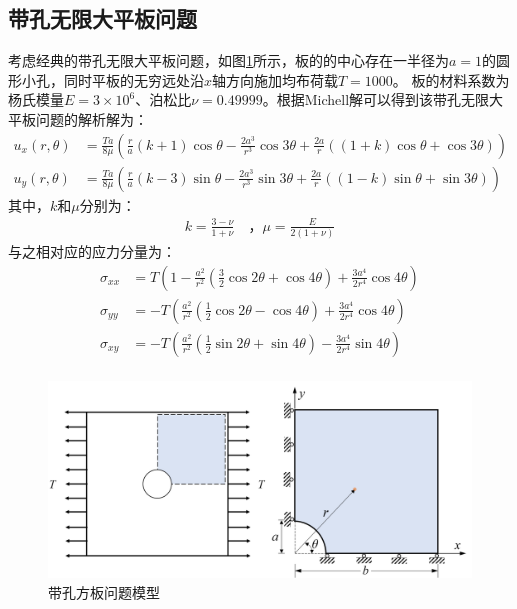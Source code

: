 \subsection{带孔无限大平板问题}

考虑经典的带孔无限大平板问题，如图\ref{ch_4:fig:hole}所示，板的的中心存在一半径为$a=1$的圆形小孔，同时平板的无穷远处沿$x$轴方向施加均布荷载$T=1000$。 板的材料系数为杨氏模量$E=3\times10^6$、泊松比$\nu=0.49999$。根据Michell解可以得到该带孔无限大平板问题的解析解为：
\begin{equation}\label{ch_4:eq:plate_with_hole_exact}
    \begin{split}
        u_x(r,\theta)&=\frac{Ta}{8\mu}(\frac{r}{a}(k+1)\cos\theta-\frac{2a^3}{r^3}\cos3\theta    +\frac{2a}{r}((1+k)\cos\theta+\cos3\theta))\\
        u_y(r,\theta)&=\frac{Ta}{8\mu}(\frac{r}{a}(k-3)\sin\theta-\frac{2a^3}{r^3}\sin3\theta    +\frac{2a}{r}((1-k)\sin\theta+\sin3\theta))  
    \end{split}
\end{equation}
其中，$k$和$\mu$分别为：
\begin{equation}
    \begin{split}
        k=\frac{3-\nu}{1+\nu}\quad \text{，}\mu=\frac{E}{2(1+\nu)}
    \end{split}
\end{equation}
与之相对应的应力分量为：
\begin{equation}
\begin{split}
    \sigma_{xx}&=T(1-\frac{a^2}{r^2}(\frac{3}{2}\cos2\theta+\cos4\theta)+\frac{3a^4}{2r^4}\cos4\theta)\\
    \sigma_{yy}&=-T(\frac{a^2}{r^2}(\frac{1}{2}\cos2\theta-\cos4\theta)+\frac{3a^4}{2r^4}\cos4\theta)\\
    \sigma_{xy}&=-T(\frac{a^2}{r^2}(\frac{1}{2}\sin2\theta+\sin4\theta)-\frac{3a^4}{2r^4}\sin4\theta)\\
\end{split}
\end{equation}

\begin{figure}[!h]
    \centering 
        \includegraphics[scale=0.5]{figures/ch_4/hole.png}
        \caption{带孔方板问题模型}\label{ch_4:fig:hole}
\end{figure}

